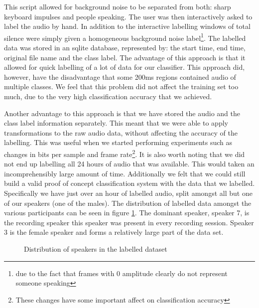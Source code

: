\documentclass[ %
                    author={Sam Phippen},
                supervisor={Dr. Rafal Bogacz},
                     title={Real time voice activity detectors in noisy personal computing environments},
                  subtitle={},
                    degree={MEng},
                      year={2012} ]{thesis}
\begin{document}
This script allowed for background noise to be separated from both: sharp
keyboard impulses and people speaking. The user was then interactively asked to
label the audio by hand. In addition to the interactive labelling windows of
total silence were simply given a homogeneous background noise
label\footnote{due to the fact that frames with 0 amplitude clearly do not
represent someone speaking}. The labelled data was stored in an sqlite
database, represented by: the start time, end time, original file name and the
class label. The advantage of this approach is that it allowed for quick
labelling of a lot of data for our classifier. This approach did, however, have
the disadvantage that some 200ms regions contained audio of multiple classes.
We feel that this problem did not affect the training set too much, due to the
very high classification accuracy that we achieved.

Another advantage to this approach is that we have stored the audio and the
class label information separately. This meant that we were able to apply
transformations to the raw audio data, without affecting the accuracy of the
labelling. This was useful when we started performing experiments such as
changes in bits per sample and frame rate\footnote{These changes have some
important affect on classification accuracy}. It is also worth noting that we
did not end up labelling all 24 hours of audio that was available. This would
taken an incomprehensibly large amount of time. Additionally we felt that we
could still build a valid proof of concept classification system with the data
that we labelled. Specifically we have just over an hour of labelled audio,
split amongst all but one of our speakers (one of the males). The distribution
of labelled data amongst the various participants can be seen in figure
\ref{img:speaker_distribution}. The dominant speaker, speaker 7, is the
recording speaker this speaker was present in every recording session. Speaker
3 is the female speaker and forms a relatively large part of the data set.

\begin{figure}
    \label{img:speaker_distribution}
    \caption{Distribution of speakers in the labelled dataset}
\end{figure}
\end{document}

